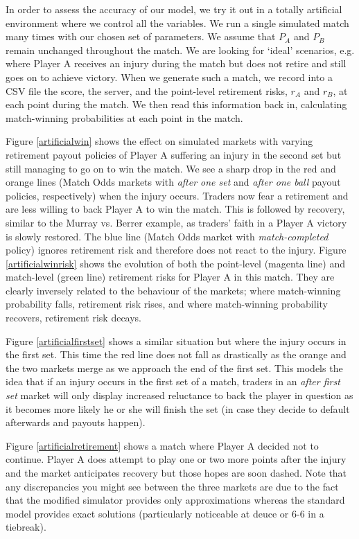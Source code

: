 \documentclass[letterpaper,12pt]{article}
\begin{document}
In order to assess the accuracy of our model, we try it out in a totally artificial environment where we control all the variables.  We run a single simulated match many times with our chosen set of parameters.  We assume that $P_A$ and $P_B$ remain unchanged throughout the match.  We are looking for `ideal' scenarios, e.g. where Player A receives an injury during the match but does not retire and still goes on to achieve victory.  When we generate such a match, we record into a CSV file the score, the server, and the point-level retirement risks, $r_A$ and $r_B$, at each point during the match.  We then read this information back in, calculating match-winning probabilities at each point in the match.

Figure \ref{artificialwin} shows the effect on simulated markets with varying retirement payout policies of Player A suffering an injury in the second set but still managing to go on to win the match.  We see a sharp drop in the red and orange lines (Match Odds markets with \textit{after one set} and \textit{after one ball} payout policies, respectively) when the injury occurs.  Traders now fear a retirement and are less willing to back Player A to win the match.  This is followed by recovery, similar to the Murray vs. Berrer example, as traders' faith in a Player A victory is slowly restored.  The blue line (Match Odds market with \textit{match-completed} policy) ignores retirement risk and therefore does not react to the injury.  Figure \ref{artificialwinrisk} shows the evolution of both the point-level (magenta line) and match-level (green line) retirement risks for Player A in this match.  They are clearly inversely related to the behaviour of the markets; where match-winning probability falls, retirement risk rises, and where match-winning probability recovers, retirement risk decays.

Figure \ref{artificialfirstset} shows a similar situation but where the injury occurs in the first set.  This time the red line does not fall as drastically as the orange and the two markets merge as we approach the end of the first set.  This models the idea that if an injury occurs in the first set of a match, traders in an \textit{after first set} market will only display increased reluctance to back the player in question as it becomes more likely he or she will finish the set (in case they decide to default afterwards and payouts happen).

Figure \ref{artificialretirement} shows a match where Player A decided not to continue.  Player A does attempt to play one or two more points after the injury and the market anticipates recovery but those hopes are soon dashed.  Note that any discrepancies you might see between the three markets are due to the fact that the modified simulator provides only approximations whereas the standard model provides exact solutions (particularly noticeable at deuce or 6-6 in a tiebreak).
\end{document}
